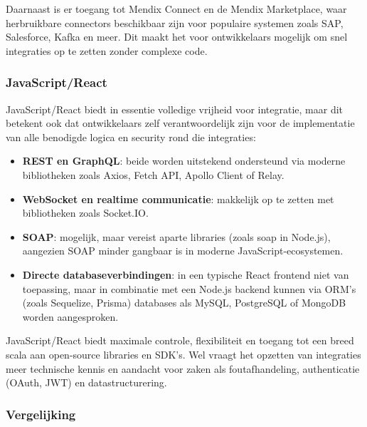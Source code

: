Daarnaast is er toegang tot Mendix Connect en de Mendix Marketplace, waar herbruikbare connectors beschikbaar zijn voor populaire systemen zoals SAP, Salesforce, Kafka en meer. Dit maakt het voor ontwikkelaars mogelijk om snel integraties op te zetten zonder complexe code.

\subsubsection{JavaScript/React}

JavaScript/React biedt in essentie volledige vrijheid voor integratie, maar dit betekent ook dat ontwikkelaars zelf verantwoordelijk zijn voor de implementatie van alle benodigde logica en security rond die integraties:
\begin{itemize}
    \item \textbf{REST en GraphQL}: beide worden uitstekend ondersteund via moderne bibliotheken zoals Axios, Fetch API, Apollo Client of Relay.
    \item \textbf{WebSocket en realtime communicatie}: makkelijk op te zetten met bibliotheken zoals Socket.IO.
    \item \textbf{SOAP}: mogelijk, maar vereist aparte libraries (zoals soap in Node.js), aangezien SOAP minder gangbaar is in moderne JavaScript-ecosystemen.
    \item \textbf{Directe databaseverbindingen}: in een typische React frontend niet van toepassing, maar in combinatie met een Node.js backend kunnen via ORM's (zoals Sequelize, Prisma) databases als MySQL, PostgreSQL of MongoDB worden aangesproken.
\end{itemize}

JavaScript/React biedt maximale controle, flexibiliteit en toegang tot een breed scala aan open-source libraries en SDK’s. Wel vraagt het opzetten van integraties meer technische kennis en aandacht voor zaken als foutafhandeling, authenticatie (OAuth, JWT) en datastructurering.

\subsubsection{Vergelijking}

